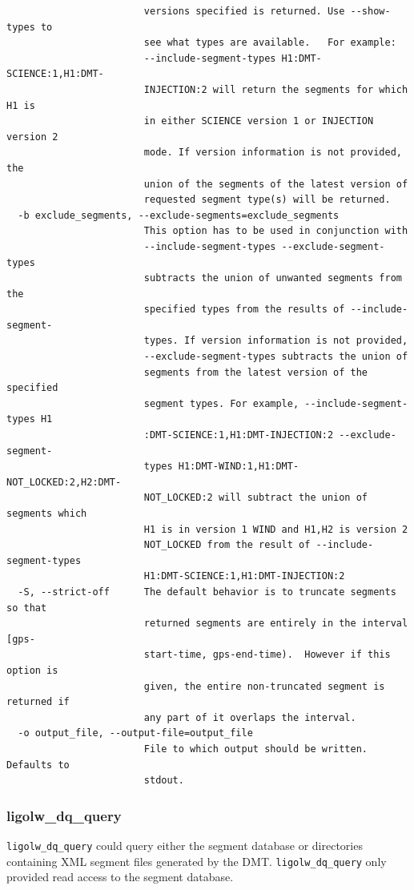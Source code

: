 {\begin{verbatim}
                        versions specified is returned. Use --show-types to
                        see what types are available.   For example:
                        --include-segment-types H1:DMT-SCIENCE:1,H1:DMT-
                        INJECTION:2 will return the segments for which H1 is
                        in either SCIENCE version 1 or INJECTION version 2
                        mode. If version information is not provided, the
                        union of the segments of the latest version of
                        requested segment type(s) will be returned.
  -b exclude_segments, --exclude-segments=exclude_segments
                        This option has to be used in conjunction with
                        --include-segment-types --exclude-segment-types
                        subtracts the union of unwanted segments from the
                        specified types from the results of --include-segment-
                        types. If version information is not provided,
                        --exclude-segment-types subtracts the union of
                        segments from the latest version of the specified
                        segment types. For example, --include-segment-types H1
                        :DMT-SCIENCE:1,H1:DMT-INJECTION:2 --exclude-segment-
                        types H1:DMT-WIND:1,H1:DMT-NOT_LOCKED:2,H2:DMT-
                        NOT_LOCKED:2 will subtract the union of segments which
                        H1 is in version 1 WIND and H1,H2 is version 2
                        NOT_LOCKED from the result of --include-segment-types
                        H1:DMT-SCIENCE:1,H1:DMT-INJECTION:2
  -S, --strict-off      The default behavior is to truncate segments so that
                        returned segments are entirely in the interval [gps-
                        start-time, gps-end-time).  However if this option is
                        given, the entire non-truncated segment is returned if
                        any part of it overlaps the interval.
  -o output_file, --output-file=output_file
                        File to which output should be written.  Defaults to
                        stdout.
\end{verbatim}
}

\subsubsection{ligolw\_dq\_query}

\texttt{ligolw\_dq\_query} could query either the segment database or directories
containing XML segment files generated by the DMT.
\texttt{ligolw\_dq\_query}
only provided read access to the segment database. 

